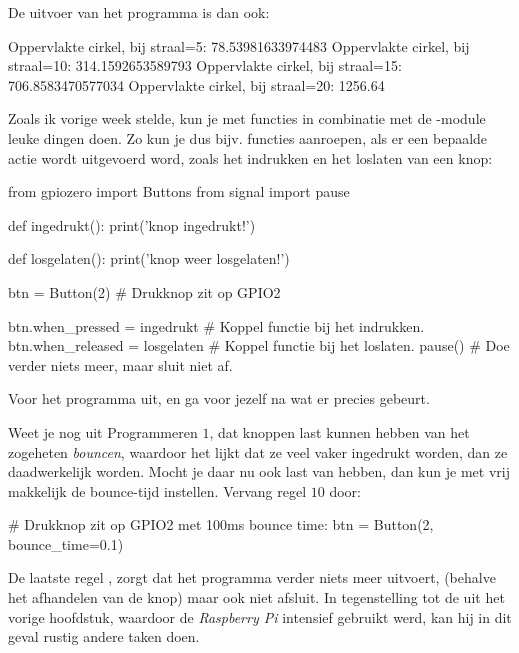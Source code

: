 De uitvoer van het programma is dan ook:
\begin{python}
Oppervlakte cirkel, bij straal=5:  78.53981633974483
Oppervlakte cirkel, bij straal=10: 314.1592653589793
Oppervlakte cirkel, bij straal=15: 706.8583470577034
Oppervlakte cirkel, bij straal=20: 1256.64
\end{python}

\newpage
Zoals ik vorige week stelde, kun je met functies in combinatie met de -module leuke dingen doen. Zo kun je dus bijv. functies aanroepen, als er een bepaalde actie wordt uitgevoerd word, zoals het indrukken en het loslaten van een knop:
\begin{python}
from gpiozero import Buttons
from signal import pause

def ingedrukt():
	print('knop ingedrukt!')

def losgelaten():
	print('knop weer losgelaten!')

btn = Button(2)  # Drukknop zit op GPIO2

btn.when_pressed = ingedrukt    # Koppel functie bij het indrukken.
btn.when_released = losgelaten  # Koppel functie bij het loslaten.
pause()                         # Doe verder niets meer, maar sluit niet af.
\end{python}

\begin{exercise}
Voor het programma uit, en ga voor jezelf na wat er precies gebeurt.
\end{exercise}

\begin{remark}
Weet je nog uit Programmeren $1$, dat knoppen last kunnen hebben van het zogeheten \textit{bouncen}, waardoor het lijkt dat ze veel vaker ingedrukt worden, dan ze daadwerkelijk worden. Mocht je daar nu ook last van hebben, dan kun je met  vrij makkelijk de bounce-tijd instellen. Vervang regel $10$ door:
\begin{python}
# Drukknop zit op GPIO2 met 100ms bounce time:
btn = Button(2, bounce_time=0.1)  
\end{python}
\end{remark}

De laatste regel , zorgt dat het programma verder niets meer uitvoert, (behalve het afhandelen van de knop) maar ook niet afsluit. In tegenstelling tot de  uit het vorige hoofdstuk, waardoor de \textit{Raspberry Pi} intensief gebruikt werd, kan hij in dit geval rustig andere taken doen. 

